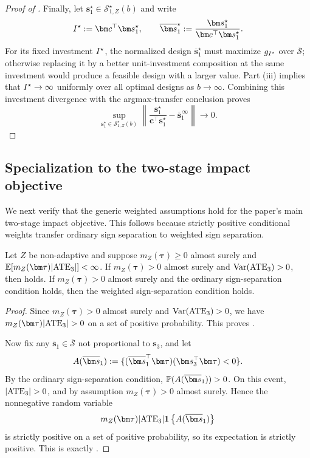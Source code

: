 \begin{proof}[Proof of ]
  Finally, let $\bm s_1^\star\in\mathcal S_{1,Z}^\star(b)$ and write
  \[
    \invst^\star\defeq \bm c^\top\bm s_1^\star,
    \qquad
    \overline{\bm s}_1^\star
    \defeq
    \frac{\bm s_1^\star}{\bm c^\top\bm s_1^\star}.
  \]
  For its fixed investment $I^\star$, the normalized design $\overline{\bm s}_1^\star$ must maximize $g_{I^\star}$ over $\overline{\mathcal S}$; otherwise replacing it by a better unit-investment composition at the same investment would produce a feasible design with a larger value.
  Part (iii) implies that $I^\star\to\infty$ uniformly over all optimal designs as $b\to\infty$.
  Combining this investment divergence with the argmax-transfer conclusion proves
  \[
    \sup_{\bm s_1^\star\in\mathcal S_{1,Z}^\star(b)}
    \left\|
    \frac{\bm s_1^\star}{\bm c^\top\bm s_1^\star}
    -
    \overline{\bm s}_1^{\,\infty}
    \right\|
    \to0.
  \]
\end{proof}

\subsection*{Specialization to the two-stage impact objective}

We next verify that the generic weighted assumptions hold for the paper's main two-stage impact objective. This follows because strictly positive conditional weights transfer ordinary sign separation to weighted sign separation.

\begin{lemma}
  \label{prop:positive-conditional-weight-appendix}
  Let $Z$ be non-adaptive and suppose $m_Z(\bm\tau)\ge0$ almost surely and $\E[m_Z(\bm\tau)|\ATE_3|]<\infty$.
  If $m_Z(\bm\tau)>0$ almost surely and ${\rm Var}(\mathrm{ATE}_3)>0$, then  holds.
  If $m_Z(\bm\tau)>0$ almost surely and the ordinary sign-separation condition  holds, then the weighted sign-separation condition  holds.
\end{lemma}

\begin{proof}
  Since $m_Z(\bm\tau)>0$ almost surely and ${\rm Var}(\mathrm{ATE}_3)>0$, we have $m_Z(\bm\tau)|\ATE_3|>0$ on a set of positive probability.
  This proves .

  Now fix any $\overline{\bm s}_1\in\overline{\mathcal{S}}$ not proportional to $\bm s_3$, and let
  \[
    A(\overline{\bm s}_1)
    \defeq
    \{(\overline{\bm s}_1^\top\bm\tau)(\bm s_3^\top\bm\tau)<0\}.
  \]
  By the ordinary sign-separation condition, $\P(A(\overline{\bm s}_1))>0$.
  On this event, $|\ATE_3|>0$, and by assumption $m_Z(\bm\tau)>0$ almost surely.
  Hence the nonnegative random variable
  \[
    m_Z(\bm\tau)|\ATE_3|\indic{A(\overline{\bm s}_1)}
  \]
  is strictly positive on a set of positive probability, so its expectation is strictly positive.
  This is exactly .
\end{proof}

